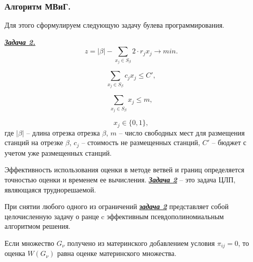 \begin{frame}
    
    \frametitle{Алгоритм МВиГ.}
    \fontsize{8pt}{7.2}\selectfont
    Для этого сформулируем следующую задачу булева программирования.

    \underline{\textit{\textbf{Задача 2.}}}
    \begin{displaymath}\label{present:task2}
        z = |\beta| - \sum\limits_{x_j \in S_\beta} 2 \cdot r_j x_j \rightarrow min.
    \end{displaymath}

    \begin{displaymath}\label{eq:part4_task2_cost}
        \sum\limits_{x_j \in S_\beta} c_j x_j \leqslant C',
    \end{displaymath}

    \begin{displaymath}\label{eq:part4_task2_m}
        \sum\limits_{x_j \in S_\beta} x_j \leqslant m,
    \end{displaymath}

    \begin{displaymath}
        x_j \in \{0, 1\},
    \end{displaymath}
    где $|\beta|$ -- длина отрезка отрезка  $\beta$, $m$ -- число свободных мест для размещения станций на отрезке $\beta$, $c_j$ -- стоимость не размещенных станций, $C'$ -- бюджет с учетом уже размещенных станций.

    \bigskip
    Эффективность использования оценки в методе ветвей и границ определяется точностью оценки и временем ее вычисления. \underline{\textit{\textbf{Задача 2}}} -- это задача ЦЛП, являющаяся труднорешаемой. 

    При снятии любого одного из ограничений \underline{\textit{\textbf{задача 2}}} представляет собой целочисленную задачу о ранце c эффективным псевдополиномиальным алгоритмом решения.
    
    \bigskip
    Если множество $G_\nu$ получено из материнского добавлением условия $\pi_{ij}=0$, то оценка $W(G_\nu)$ равна оценке материнского множества.

\end{frame}

